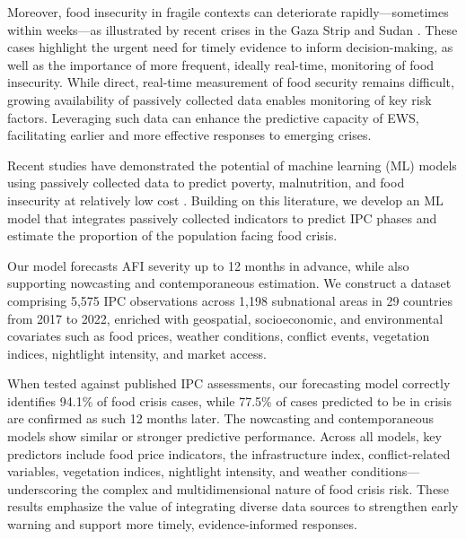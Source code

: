 \documentclass[pdflatex,sn-mathphys-num]{sn-jnl}%
\theoremstyle{thmstyleone}%
\theoremstyle{thmstyletwo}%
\theoremstyle{thmstylethree}%
\begin{document}
Moreover, food insecurity in fragile contexts can deteriorate rapidly—sometimes within weeks—as illustrated by recent crises in the Gaza Strip and Sudan \citep{vos2024famine, reardon2024african}. These cases highlight the urgent need for timely evidence to inform decision-making, as well as the importance of more frequent, ideally real-time, monitoring of food insecurity. While direct, real-time measurement of food security remains difficult, growing availability of passively collected data enables monitoring of key risk factors. Leveraging such data can enhance the predictive capacity of EWS, facilitating earlier and more effective responses to emerging crises.

Recent studies have demonstrated the potential of machine learning (ML) models using passively collected data to predict poverty, malnutrition, and food insecurity at relatively low cost \citep{andree2020predicting, westerveld2021forecasting, balashankar2023predicting, martini2022machine}. Building on this literature, we develop an ML model that integrates passively collected indicators to predict IPC phases and estimate the proportion of the population facing food crisis.%

Our model forecasts AFI severity up to 12 months in advance, while also supporting nowcasting and contemporaneous estimation. We construct a dataset comprising 5,575 IPC observations across 1,198 subnational areas in 29 countries from 2017 to 2022, enriched with geospatial, socioeconomic, and environmental covariates such as food prices, weather conditions, conflict events, vegetation indices, nightlight intensity, and market access.

When tested against published IPC assessments, our forecasting model correctly identifies 94.1\% of food crisis cases, while 77.5\% of cases  predicted to be in crisis are confirmed as such 12 months later. The nowcasting and contemporaneous models show similar or stronger predictive performance. Across all models, key predictors include food price indicators, the infrastructure index, conflict-related variables, vegetation indices, nightlight intensity, and weather conditions—underscoring the complex and multidimensional nature of food crisis risk. These results emphasize the value of integrating diverse data sources to strengthen early warning and support more timely, evidence-informed responses.
\end{document}
